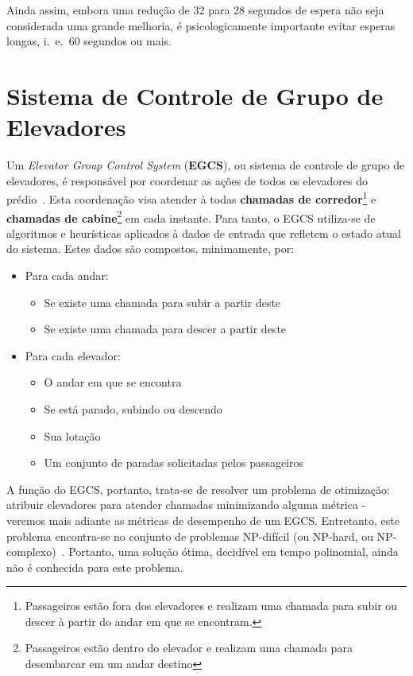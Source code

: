 {\color{red}Ainda assim, embora uma redução de 32 para 28 segundos de espera não seja considerada uma grande melhoria, é psicologicamente importante evitar esperas longas, i.~e.~60 segundos ou mais.} %

\section{Sistema de Controle de Grupo de Elevadores}

Um \textit{Elevator Group Control System} (\textbf{EGCS}), ou sistema de controle de grupo de elevadores, é responsável por coordenar as ações de todos os elevadores do prédio~\cite{kuzunuki1984elevator}. Esta coordenação visa atender à todas \textbf{chamadas de corredor}\footnote{Passageiros estão fora dos elevadores e realizam uma chamada para subir ou descer à partir do andar em que se encontram.} e \textbf{chamadas de cabine}\footnote{Passageiros estão dentro do elevador e realizam uma chamada para desembarcar em um andar destino} em cada instante. Para tanto, o EGCS utiliza-se de algoritmos e heurísticas aplicados à dados de entrada que refletem o estado atual do sistema. Estes dados são compostos, minimamente, por:

\begin{itemize}
  \item Para cada andar:
  \begin{itemize}
    \item Se existe uma chamada para subir a partir deste
    \item Se existe uma chamada para descer a partir deste
  \end{itemize}
  \item Para cada elevador:
  \begin{itemize}
    \item O andar em que se encontra
    \item Se está parado, subindo ou descendo
    \item Sua lotação
    \item Um conjunto de paradas solicitadas pelos passageiros
  \end{itemize}
\end{itemize}

A função do EGCS, portanto, trata-se de resolver um problema de otimização: atribuir elevadores para atender chamadas minimizando alguma métrica - veremos mais adiante as métricas de desempenho de um EGCS. Entretanto, este problema encontra-se no conjunto de problemas NP-difícil (ou NP-hard, ou NP-complexo)~\cite{SeKo99}. Portanto, uma solução ótima, decidível em tempo polinomial, ainda não é conhecida para este problema.

